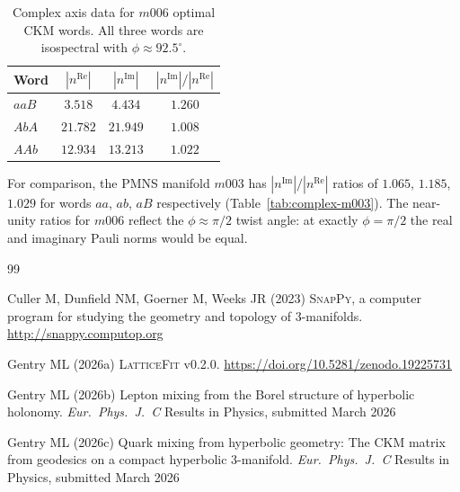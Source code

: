 \documentclass[11pt,a4paper]{article}
\begin{document}
\begin{table}[ht]
\caption{Complex axis data for $m006$ optimal CKM words.  All three
  words are isospectral with $\phi \approx 92.5^\circ$.}
\label{tab:complex-m006}
\centering
\begin{tabular}{lccc}
\toprule
Word & $|n^{\mathrm{Re}}|$ & $|n^{\mathrm{Im}}|$
     & $|n^{\mathrm{Im}}|/|n^{\mathrm{Re}}|$ \\
\midrule
$aaB$ & $3.518$  & $4.434$  & $1.260$ \\
$AbA$ & $21.782$ & $21.949$ & $1.008$ \\
$AAb$ & $12.934$ & $13.213$ & $1.022$ \\
\bottomrule
\end{tabular}
\end{table}

For comparison, the PMNS manifold $m003$ has
$|n^{\mathrm{Im}}|/|n^{\mathrm{Re}}|$ ratios of $1.065$, $1.185$,
$1.029$ for words $aa$, $ab$, $aB$ respectively
(Table~\ref{tab:complex-m003}).  The near-unity ratios for $m006$
reflect the $\phi \approx \pi/2$ twist angle: at exactly
$\phi = \pi/2$ the real and imaginary Pauli norms would be equal.

\begin{thebibliography}{99}

Culler M, Dunfield NM, Goerner M, Weeks JR (2023)
\textsc{SnapPy}, a computer program for studying the geometry and
topology of 3-manifolds.
\url{http://snappy.computop.org}

Gentry ML (2026a)
\textsc{LatticeFit} v0.2.0.
\url{https://doi.org/10.5281/zenodo.19225731}

Gentry ML (2026b)
Lepton mixing from the Borel structure of hyperbolic holonomy.
\textit{Eur.\ Phys.\ J.\ C} Results in Physics, submitted March 2026

Gentry ML (2026c)
Quark mixing from hyperbolic geometry: The CKM matrix from geodesics
on a compact hyperbolic 3-manifold.
\textit{Eur.\ Phys.\ J.\ C} Results in Physics, submitted March 2026

\end{thebibliography}
\end{document}
